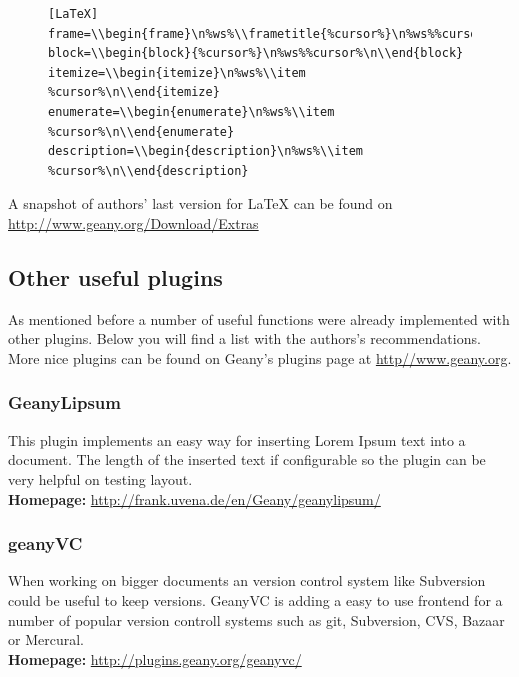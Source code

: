 \documentclass[%
a4paper,%
10pt,%
oneside,%
DIV18,
headsepline,
plainheadsepline,
footsepline,
plainfootsepline,
bibtotoc,%
liststotoc,%
BCOR12mm,%
halfparskip,%
openany,%
]{scrartcl}
\begin{document}
\begin{figure}[h!]
\begin{lstlisting}
[LaTeX]
frame=\\begin{frame}\n%ws%\\frametitle{%cursor%}\n%ws%%cursor%\n\\end{frame}
block=\\begin{block}{%cursor%}\n%ws%%cursor%\n\\end{block}
itemize=\\begin{itemize}\n%ws%\\item %cursor%\n\\end{itemize}
enumerate=\\begin{enumerate}\n%ws%\\item %cursor%\n\\end{enumerate}
description=\\begin{description}\n%ws%\\item %cursor%\n\\end{description}
\end{lstlisting}
\end{figure}

A snapshot of authors' last version for LaTeX can be found on
\url{http://www.geany.org/Download/Extras}

\subsection{Other useful plugins}
As mentioned before a number of useful functions were already
implemented with other plugins. Below you will find a list with the
authors's recommendations. More nice plugins can be found on Geany's
plugins page at \url{http//www.geany.org}.

\subsubsection{GeanyLipsum}
This plugin implements an easy way for inserting Lorem Ipsum text into
a document. The length of the inserted text if configurable so the
plugin can be very helpful on testing layout.\\
\textbf{Homepage:} \url{http://frank.uvena.de/en/Geany/geanylipsum/}

\subsubsection{geanyVC}
When working on bigger documents an version control system like
Subversion could be useful to keep versions. GeanyVC is adding a easy
to use frontend for a number of popular version controll systems such
as git, Subversion, CVS, Bazaar or Mercural.\\
\textbf{Homepage:} \url{http://plugins.geany.org/geanyvc/}
\end{document}
